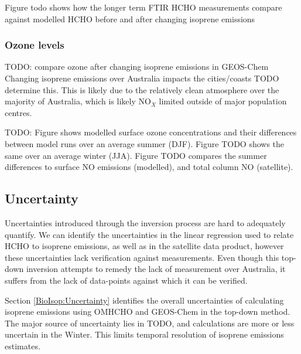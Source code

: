       Figure todo shows how the longer term FTIR HCHO measurements compare against modelled HCHO before and after changing isoprene emissions
    
    \subsubsection{Ozone levels}
    
      TODO: compare ozone after changing isoprene emissions in GEOS-Chem
      Changing isoprene emissions over Australia impacts the cities/coasts TODO determine this.
      This is likely due to the relatively clean atmosphere over the majority of Australia, which is likely NO$_X$ limited outside of major population centres.
      
      TODO: Figure shows modelled surface ozone concentrations and their differences between model runs over an average summer (DJF). 
      Figure TODO shows the same over an average winter (JJA).
      Figure TODO compares the summer differences to surface NO emissions (modelled), and total column NO (satellite).
      
  \subsection{Uncertainty}
    \label{Model:Conclusions:Uncertainty}
    Uncertainties introduced through the inversion process are hard to adequately quantify. 
    We can identify the uncertainties in the linear regression used to relate HCHO to isoprene emissions, as well as in the satellite data product, however these uncertainties lack verification against measurements.
    Even though this top-down inversion attempts to remedy the lack of measurement over Australia, it suffers from the lack of data-points against which it can be verified.
    
    Section \ref{BioIsop:Uncertainty} identifies the overall uncertainties of calculating isoprene emissions using OMHCHO and GEOS-Chem in the top-down method.
    The major source of uncertainty lies in TODO, and calculations are more or less uncertain in the Winter.
    This limits temporal resolution of isoprene emissions estimates.
  
%  
  